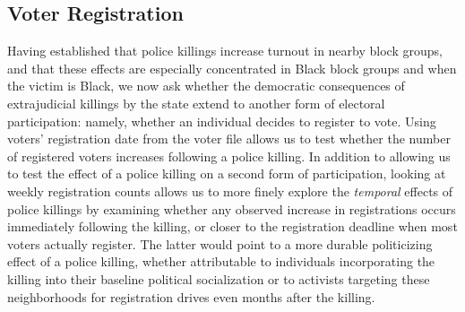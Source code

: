 \documentclass[12pt]{article}
\begin{document}
\subsection*{Voter Registration}

Having established that police killings increase turnout in nearby block groups, and that these effects are especially concentrated in Black block groups and when the victim is Black, we now ask whether the democratic consequences of extrajudicial killings by the state extend to another form of electoral participation: namely, whether an individual decides to register to vote. Using voters' registration date from the voter file allows us to test whether the number of registered voters increases following a police killing. In addition to allowing us to test the effect of a police killing on a second form of participation, looking at weekly registration counts allows us to more finely explore the \textit{temporal} effects of police killings by examining whether any observed increase in registrations occurs immediately following the killing, or closer to the registration deadline when most voters actually register. The latter would point to a more durable politicizing effect of a police killing, whether attributable to individuals incorporating the killing into their baseline political socialization or to activists targeting these neighborhoods for registration drives even months after the killing.
\end{document}
